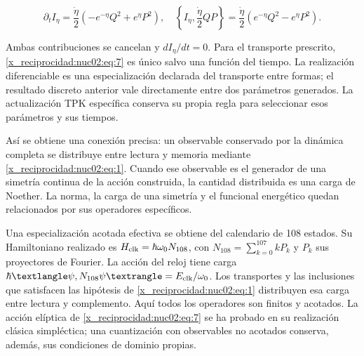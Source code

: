 \[
\partial_tI_\eta=\frac{\dot\eta}{2}(-e^{-\eta}Q^2+e^\eta P^2),
\quad
\left\{I_\eta,\frac{\dot\eta}{2}QP\right\}
=\frac{\dot\eta}{2}(e^{-\eta}Q^2-e^\eta P^2).
\]

Ambas contribuciones se cancelan y \(dI_\eta/dt=0\). Para el transporte prescrito, \eqref{x_reciprocidad:nuc02:eq:7} es único salvo una función del tiempo. La realización diferenciable es una especialización declarada del transporte entre formas; el resultado discreto anterior vale directamente entre dos parámetros generados. La actualización TPK específica conserva su propia regla para seleccionar esos parámetros y sus tiempos.

Así se obtiene una conexión precisa: un observable conservado por la dinámica completa se distribuye entre lectura y memoria mediante \eqref{x_reciprocidad:nuc02:eq:1}. Cuando ese observable es el generador de una simetría continua de la acción construida, la cantidad distribuida es una carga de Noether. La norma, la carga de una simetría y el funcional energético quedan relacionados por sus operadores específicos.

Una especialización acotada efectiva se obtiene del calendario de 108 estados. Su Hamiltoniano realizado es \(H_{\rm clk}=\hbar\omega_0N_{108}\), con \(N_{108}=\sum_{k=0}^{107}kP_k\) y \(P_k\) sus proyectores de Fourier. La acción del reloj tiene carga \(\hbar\langle\psi,N_{108}\psi\rangle=E_{\rm clk}/\omega_0\). Los transportes y las inclusiones que satisfacen las hipótesis de \eqref{x_reciprocidad:nuc02:eq:1} distribuyen esa carga entre lectura y complemento. Aquí todos los operadores son finitos y acotados. La acción elíptica de \eqref{x_reciprocidad:nuc02:eq:7} se ha probado en su realización clásica simpléctica; una cuantización con observables no acotados conserva, además, sus condiciones de dominio propias.
